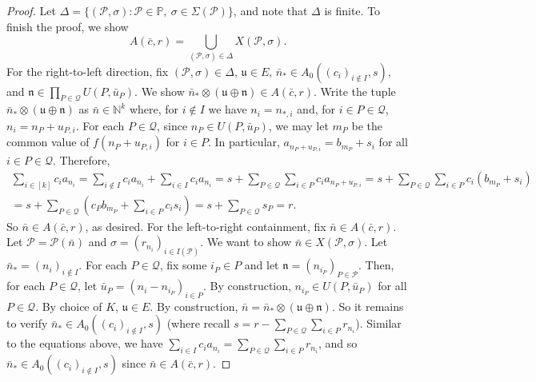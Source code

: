 \documentclass{amsart}
\newcommand{\cbar}{\bar{c}}
\newcommand{\nbar}{\bar{n}}
\newcommand{\ubar}{\bar{u}}
\newcommand{\ku}{\mathfrak{u}}
\newcommand{\kn}{\mathfrak{n}}
\newcommand{\cP}{\mathcal{P}}
\newcommand{\cQ}{\mathcal{Q}}
\def\N{\mathbb N}
\def\P{\mathbb P}
\theoremstyle{definition}
\begin{document}
\begin{proof}
Let $\Delta=\{(\cP,\sigma):\cP\in\P,~\sigma\in \Sigma(\cP)\}$, and note that $\Delta$ is finite. To finish the proof, we show
\[
A(\cbar,r)=\bigcup_{(\cP,\sigma)\in\Delta}X(\cP,\sigma).
\]
For the right-to-left direction, fix $(\cP,\sigma)\in\Delta$, $\ku\in E$, $\nbar_*\in A_0((c_i)_{i\not\in I},s)$, and $\kn\in\prod_{P\in\cQ}U(P,\ubar_P)$. We show $\nbar_*\otimes(\ku\oplus\kn)\in A(\cbar,r)$.  Write the tuple $\nbar_*\otimes(\ku\oplus\kn)$ as $\nbar\in\N^k$ where, for $i\not\in I$ we have $n_i=n_{*,i}$ and, for $i\in P\in\cQ$, $n_i=n_P+u_{P,i}$. For each $P\in\cQ$, since $n_P\in U(P,\ubar_P)$, we may let $m_P$ be the common value of $f(n_P+u_{P,i})$ for $i\in P$. In particular, $a_{n_P+u_{P,i}}=b_{m_P}+s_i$ for all $i\in P\in\cQ$. Therefore,
\begin{multline*}
\sum_{i\in [k]}c_ia_{n_i} = \sum_{i\not\in I}c_ia_{n_i}+\sum_{i\in I}c_ia_{n_i}=s+\sum_{P\in\cQ}\sum_{i\in P}c_ia_{n_P+u_{P,i}} =s+\sum_{P\in\cQ}\sum_{i\in P}c_i(b_{m_P}+s_i)\\
=s+\sum_{P\in\cQ}\left(c_Pb_{m_P}+\sum_{i\in P}c_is_i\right)=s+\sum_{P\in\cQ}s_P=r.
\end{multline*}
So $\nbar\in A(\cbar,r)$, as desired. For the left-to-right containment, fix $\nbar\in A(\cbar,r)$. Let $\cP=\cP(\nbar)$ and $\sigma=(r_{n_i})_{i\in I(\cP)}$. We want to show $\nbar\in X(\cP,\sigma)$. Let $\nbar_*=(n_i)_{i\not\in I}$. For each $P\in\cQ$, fix some $i_P\in P$ and let $\kn=(n_{i_P})_{P\in\cP}$. Then, for each $P\in \cQ$, let $\ubar_P=(n_i-n_{i_P})_{i\in P}$. By construction, $n_{i_P}\in U(P,\ubar_P)$ for all $P\in\cQ$. By choice of $K$, $\ku\in E$. By construction, $\nbar=\nbar_*\otimes(\ku\oplus\kn)$. So it remains to verify $\nbar_*\in A_0((c_i)_{i\not\in I},s)$ (where recall $s=r-\sum_{P\in\cQ}\sum_{i\in P}r_{n_i}$). Similar to the equations above, we have $\sum_{i\in I}c_ia_{n_i}=\sum_{P\in\cQ}\sum_{i\in P}r_{n_i}$, and so $\nbar_*\in A_0((c_i)_{i\not\in I},s)$ since $\nbar\in A(\cbar,r)$.
\end{proof}
\end{document}
